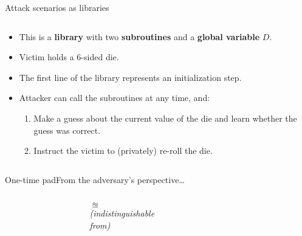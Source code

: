 \documentclass[aspectratio=169, lualatex, handout]{beamer}
\begin{document}
\begin{frame}{Attack scenarios as libraries}
	\begin{columns}[c]
		\begin{column}{0.65\textwidth}
			\begin{itemize}[<+->]
				\item This is a \textbf{library} with two \textbf{subroutines} and a \textbf{global variable} $D$.
				\item Victim holds a 6-sided die.
				\item The first line of the library represents an initialization step.
				\item Attacker can call the subroutines at any time, and:
				      \begin{enumerate}
					      \item Make a guess about the current value of the die and learn whether the guess was correct.
					      \item Instruct the victim to (privately) re-roll the die.
				      \end{enumerate}
			\end{itemize}
		\end{column}
		\begin{column}{0.35\textwidth}
			\vspace{-1cm}
			\begin{center}
			\end{center}
		\end{column}
	\end{columns}
\end{frame}

\begin{frame}{One-time pad}{From the adversary's perspective\ldots}
	\begin{columns}[c]
		\begin{column}{0.35\textwidth}
		\end{column}
		\begin{column}{0.3\textwidth}
			\begin{center}
				{\huge{$\approxeq$}} \\[1em]
				{\scriptsize\textit{(indistinguishable \\ from)}}
			\end{center}
		\end{column}
		\begin{column}{0.35\textwidth}
		\end{column}
	\end{columns}
\end{frame}
\end{document}
